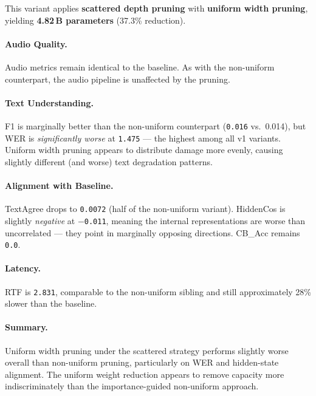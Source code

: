 \documentclass[11pt,a4paper]{article}
\newcommand{\scoreval}[1]{\texttt{#1}}
\begin{document}
This variant applies \textbf{scattered depth pruning} with \textbf{uniform width pruning}, yielding \textbf{4.82\,B parameters} (37.3\% reduction).

\paragraph{Audio Quality.}
Audio metrics remain identical to the baseline. As with the non-uniform counterpart, the audio pipeline is unaffected by the pruning.

\paragraph{Text Understanding.}
F1 is marginally better than the non-uniform counterpart (\scoreval{0.016} vs.\ 0.014), but WER is \emph{significantly worse} at \scoreval{1.475} — the highest among all v1 variants. Uniform width pruning appears to distribute damage more evenly, causing slightly different (and worse) text degradation patterns.

\paragraph{Alignment with Baseline.}
TextAgree drops to \scoreval{0.0072} (half of the non-uniform variant). HiddenCos is slightly \emph{negative} at \scoreval{$-$0.011}, meaning the internal representations are worse than uncorrelated — they point in marginally opposing directions. CB\_Acc remains \scoreval{0.0}.

\paragraph{Latency.}
RTF is \scoreval{2.831}, comparable to the non-uniform sibling and still approximately 28\% slower than the baseline.

\paragraph{Summary.}
Uniform width pruning under the scattered strategy performs slightly worse overall than non-uniform pruning, particularly on WER and hidden-state alignment. The uniform weight reduction appears to remove capacity more indiscriminately than the importance-guided non-uniform approach.

\newpage
\end{document}
